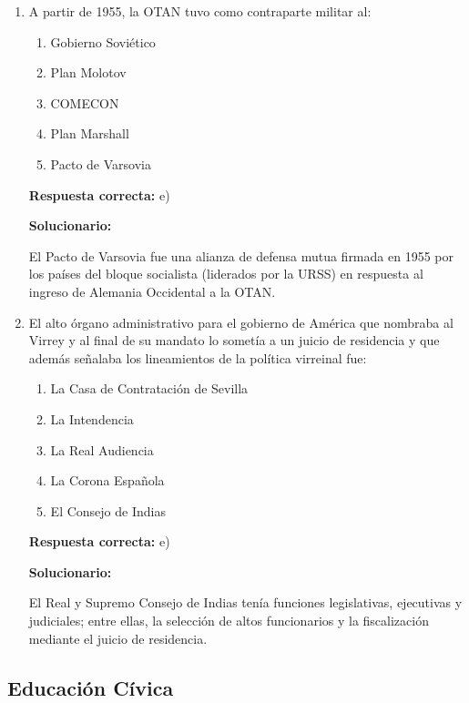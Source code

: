 \begin{enumerate}[resume]
	\vspace{6mm}

	\item A partir de 1955, la OTAN tuvo como contraparte militar al:
	\begin{enumerate}[label=\alph*)]
		\item Gobierno Soviético
		\item Plan Molotov
		\item COMECON
		\item Plan Marshall
		\item Pacto de Varsovia
	\end{enumerate}
	\textbf{Respuesta correcta:} e)

	\vspace{2mm}
	\textbf{Solucionario:}

	El Pacto de Varsovia fue una alianza de defensa mutua firmada en 1955 por los países del bloque socialista (liderados por la URSS) en respuesta al ingreso de Alemania Occidental a la OTAN.

	\vspace{6mm}

	\item El alto órgano administrativo para el gobierno de América que nombraba al Virrey y al final de su mandato lo sometía a un juicio de residencia y que además señalaba los lineamientos de la política virreinal fue:
	\begin{enumerate}[label=\alph*)]
		\item La Casa de Contratación de Sevilla
		\item La Intendencia
		\item La Real Audiencia
		\item La Corona Española
		\item El Consejo de Indias
	\end{enumerate}
	\textbf{Respuesta correcta:} e)

	\vspace{2mm}
	\textbf{Solucionario:}

	El Real y Supremo Consejo de Indias tenía funciones legislativas, ejecutivas y judiciales; entre ellas, la selección de altos funcionarios y la fiscalización mediante el juicio de residencia.

	\vspace{6mm}
\end{enumerate}


\subsection*{Educación Cívica}

